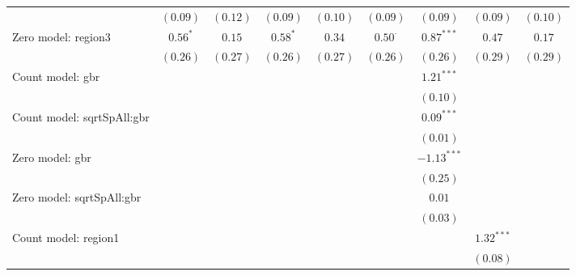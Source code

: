 \begin{sidewaystable}
\begin{center}
{\begin{tabular}{l c c c c c c c c}
                               & $(0.09)$      & $(0.12)$      & $(0.09)$      & $(0.10)$      & $(0.09)$       & $(0.09)$      & $(0.09)$       & $(0.10)$       \\
Zero model: region3            & $0.56^{*}$    & $0.15$        & $0.58^{*}$    & $0.34$        & $0.50^{\cdot}$ & $0.87^{***}$  & $0.47$         & $0.17$         \\
                               & $(0.26)$      & $(0.27)$      & $(0.26)$      & $(0.27)$      & $(0.26)$       & $(0.26)$      & $(0.29)$       & $(0.29)$       \\
Count model: gbr               &               &               &               &               &                & $1.21^{***}$  &                &                \\
                               &               &               &               &               &                & $(0.10)$      &                &                \\
Count model: sqrtSpAll:gbr     &               &               &               &               &                & $0.09^{***}$  &                &                \\
                               &               &               &               &               &                & $(0.01)$      &                &                \\
Zero model: gbr                &               &               &               &               &                & $-1.13^{***}$ &                &                \\
                               &               &               &               &               &                & $(0.25)$      &                &                \\
Zero model: sqrtSpAll:gbr      &               &               &               &               &                & $0.01$        &                &                \\
                               &               &               &               &               &                & $(0.03)$      &                &                \\
Count model: region1           &               &               &               &               &                &               & $1.32^{***}$   &                \\
                               &               &               &               &               &                &               & $(0.08)$       &                \\

\end{tabular}}
\end{center}
\end{sidewaystable}
